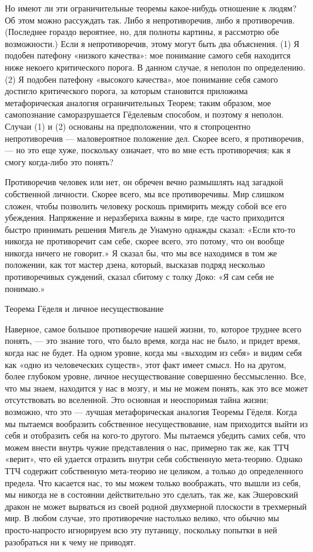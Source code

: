 \documentclass[../main.tex]{subfiles}
\begin{document}
Но имеют ли эти ограничительные теоремы какое-нибудь отношение к людям? Об этом можно рассуждать так. Либо я непротиворечив, либо я противоречив. (Последнее гораздо вероятнее, но, для полноты картины, я рассмотрю обе возможности.) Если я непротиворечив, этому могут быть два объяснения. (1) Я подобен патефону «низкого качества»: мое понимание самого себя находится ниже некоего критического порога. В данном случае, я неполон по определению. (2) Я подобен патефону «высокого качества», мое понимание себя самого достигло критического порога, за которым становится приложима метафорическая аналогия ограничительных Теорем; таким образом, мое самопознание саморазрушается Гёделевым способом, и поэтому я неполон. Случаи (1) и (2) основаны на предположении, что я стопроцентно непротиворечив --- маловероятное положение дел. Скорее всего, я противоречив, --- но это еще хуже, поскольку означает, что во мне есть противоречия; как я смогу когда-либо это понять?

Противоречив человек или нет, он обречен вечно размышлять над загадкой собственной личности. Скорее всего, мы все противоречивы. Мир слишком сложен, чтобы позволить человеку роскошь примирить между собой все его убеждения. Напряжение и неразбериха важны в мире, где часто приходится быстро принимать решения Мигель де Унамуно однажды сказал: «Если кто-то никогда не противоречит сам себе, скорее всего, это потому, что он вообще никогда ничего не говорит.» Я сказал бы, что мы все находимся в том же положении, как тот мастер дзена, который, высказав подряд несколько противоречивых суждений, сказал сбитому с толку Доко: «Я сам себя не понимаю.»

Теорема Гёделя и личное несуществование

Наверное, самое большое противоречие нашей жизни, то, которое труднее всего понять, --- это знание того, что было время, когда нас не было, и придет время, когда нас не будет. На одном уровне, когда мы «выходим из себя» и видим себя как «одно из человеческих существ», этот факт имеет смысл. Но на другом, более глубоком уровне, личное несуществование совершенно бессмысленно. Все, что мы знаем, находится у нас в мозгу, и мы не можем понять, как это все может отсутствовать во вселенной. Это основная и неоспоримая тайна жизни; возможно, что это --- лучшая метафорическая аналогия Теоремы Гёделя. Когда мы пытаемся вообразить собственное несуществование, нам приходится выйти из себя и отобразить себя на кого-то другого. Мы пытаемся убедить самих себя, что можем внести внутрь чужие представления о нас, примерно так же, как ТТЧ «верит», что ей удается отразить внутри себя собственную мета-теорию. Однако ТТЧ содержит собственную мета-теорию не целиком, а только до определенного предела. Что касается нас, то мы можем только воображать, что вышли из себя, мы никогда не в состоянии действительно это сделать, так же, как Эшеровский дракон не может вырваться из своей родной двухмерной плоскости в трехмерный мир. В любом случае, это противоречие настолько велико, что обычно мы просто-напросто игнорируем всю эту путаницу, поскольку попытки в ней разобраться ни к чему не приводят.
\end{document}
